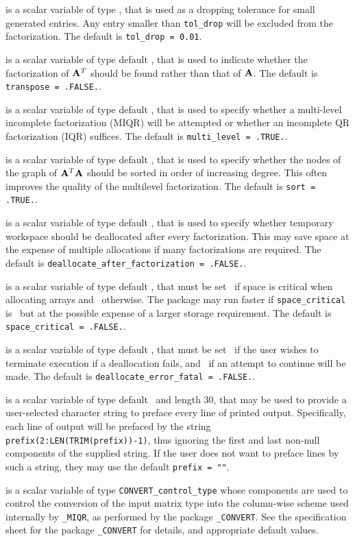 \documentclass{galahad}
\newcommand{\packagename}{MIQR}
\newcommand{\fullpackagename}{\libraryname\_\packagename}
\begin{document}
\begin{description}
 is a scalar variable of type \realdp, that is used
as a dropping tolerance for small generated entries. Any entry smaller
than  {\tt tol\_drop} will be excluded from the factorization.
The default is {\tt tol\_drop = 0.01}.

 is a scalar variable of type default \logical, that is used
to indicate whether the factorization of ${\mathbf{A}}^T$ should be found rather
than that of ${\mathbf{A}}$. 
The default is {\tt transpose = .FALSE.}.

 is a scalar variable of type default \logical, that is used
to specify whether a multi-level incomplete factorization (MIQR) will be 
attempted or whether an incomplete QR factorization (IQR) suffices.
The default is {\tt multi\_level = .TRUE.}.

 is a scalar variable of type default \logical, that is used
to specify whether the nodes of the graph of ${\mathbf{A}}^T {\mathbf{A}}$ should be sorted
in order of increasing degree. This often improves the quality of the
multilevel factorization. 
The default is {\tt sort = .TRUE.}.

 is a scalar variable of type default 
\logical, that is used to specify whether temporary workspace 
should be deallocated after every factorization. This may save space
at the expense of multiple allocations if many factorizations are required.
The default is {\tt deallocate\_after\_factorization = .FALSE.}.

 is a scalar variable of type default \logical, 
that must be set \true\ if space is critical when allocating arrays
and  \false\ otherwise. The package may run faster if 
{\tt space\_critical} is \false\ but at the possible expense of a larger
storage requirement. The default is {\tt space\_critical = .FALSE.}.

 is a scalar variable of type default \logical, 
that must be set \true\ if the user wishes to terminate execution if
a deallocation  fails, and \false\ if an attempt to continue
will be made. The default is {\tt deallocate\_error\_fatal = .FALSE.}.

 is a scalar variable of type default \character\
and length 30, that may be used to provide a user-selected 
character string to preface every line of printed output. 
Specifically, each line of output will be prefaced by the string 
{\tt prefix(2:LEN(TRIM(prefix))-1)},
thus ignoring the first and last non-null components of the
supplied string. If the user does not want to preface lines by such
a string, they may use the default {\tt prefix = ""}.

 is a scalar variable of type 
{\tt CONVERT\_control\_type}
whose components are used to control the conversion of the
input matrix type into the column-wise scheme used internally
by  {\tt \fullpackagename}, as performed by the package 
{\tt \libraryname\_CONVERT}. 
See the specification sheet for the package 
{\tt \libraryname\_CONVERT} 
for details, and appropriate default values.

\end{description}
\end{document}
